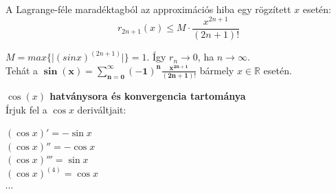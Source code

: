 \documentclass[tikz,12pt,margin=0px]{article}
\newcommand\ddfrac[2]{\frac{\displaystyle #1}{\displaystyle #2}}
\begin{document}
    \noindent A Lagrange-féle maradéktagból az approximációs hiba egy rögzített $x$ esetén:
    \[
        r_{2n+1}(x) \leq M \cdot \ddfrac{x^{2n+1}}{(2n+1)!}
    \]

    \noindent $M = max\Big\{\big|(sin x)^{(2n+1)}\big|\Big\} = 1$. Így $r_{n} \to 0$, ha $n \to \infty$.\\

    \noindent Tehát a $\boldsymbol{\sin(x) = \sum\limits_{n=0}^{\infty}(-1)^{n}\ddfrac{x^{2n+1}}{(2n+1)!}}$ bármely $x \in \mathbb{R}$ esetén.\\

      \begin{center}
        \end{center}
\newpage
    \noindent \textbf{$\cos(x)$ hatványsora és konvergencia tartománya}\\

    \noindent Írjuk fel a $\cos x$ deriváltjait:

    \begin{center}
        $(\cos x)' = -\sin x$\\
        $(\cos x)'' = -\cos x$\\
        $(\cos x)''' = \sin x$\\
        $(\cos x)^{(4)} = \cos x$\\
        $\cdots$
    \end{center}
\end{document}
